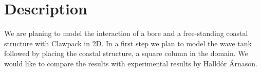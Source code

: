 \documentclass[11pt]{article}
\begin{document}
\section{Description}
We are planing to model the interaction of a bore and a free-standing coastal structure with Clawpack in 2D. In a first step we plan to model the wave tank followed by placing the coastal structure, a square column in the domain. We would like to compare the results with experimental results by Halld\'or \'Arnason.
\end{document}
